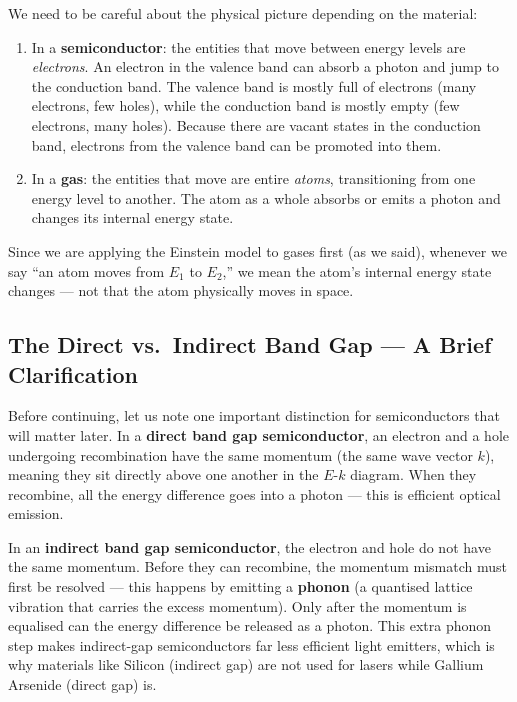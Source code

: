 We need to be careful about the physical picture depending on the material:

\begin{enumerate}
    \item In a \textbf{semiconductor}: the entities that move between energy levels are \emph{electrons}. An electron in the valence band can absorb a photon and jump to the conduction band. The valence band is mostly full of electrons (many electrons, few holes), while the conduction band is mostly empty (few electrons, many holes). Because there are vacant states in the conduction band, electrons from the valence band can be promoted into them.
    \item In a \textbf{gas}: the entities that move are entire \emph{atoms}, transitioning from one energy level to another. The atom as a whole absorbs or emits a photon and changes its internal energy state.
\end{enumerate}

Since we are applying the Einstein model to gases first (as we said), whenever we say ``an atom moves from $E_1$ to $E_2$,'' we mean the atom's internal energy state changes — not that the atom physically moves in space.

\subsection{The Direct vs.\ Indirect Band Gap — A Brief Clarification}

Before continuing, let us note one important distinction for semiconductors that will matter later. In a \textbf{direct band gap semiconductor}, an electron and a hole undergoing recombination have the same momentum (the same wave vector $k$), meaning they sit directly above one another in the $E$-$k$ diagram. When they recombine, all the energy difference goes into a photon — this is efficient optical emission.

In an \textbf{indirect band gap semiconductor}, the electron and hole do not have the same momentum. Before they can recombine, the momentum mismatch must first be resolved — this happens by emitting a \textbf{phonon} (a quantised lattice vibration that carries the excess momentum). Only after the momentum is equalised can the energy difference be released as a photon. This extra phonon step makes indirect-gap semiconductors far less efficient light emitters, which is why materials like Silicon (indirect gap) are not used for lasers while Gallium Arsenide (direct gap) is.

